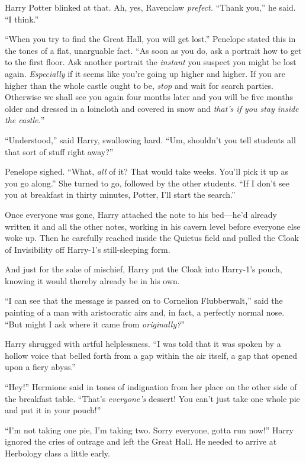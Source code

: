 Harry Potter blinked at that. Ah, yes, Ravenclaw \emph{prefect.} “Thank you,” he said. “I think.”

“When you try to find the Great Hall, you will get lost.” Penelope stated this in the tones of a flat, unarguable fact. “As soon as you do, ask a portrait how to get to the first floor. Ask another portrait the \emph{instant} you suspect you might be lost again. \emph{Especially} if it seems like you’re going up higher and higher. If you are higher than the whole castle ought to be, \emph{stop} and wait for search parties. Otherwise we shall see you again four months later and you will be five months older and dressed in a loincloth and covered in snow and \emph{that’s if you stay inside the castle.}”

“Understood,” said Harry, swallowing hard. “Um, shouldn’t you tell students all that sort of stuff right away?”

Penelope sighed. “What, \emph{all} of it? That would take weeks. You’ll pick it up as you go along.” She turned to go, followed by the other students. “If I don’t see you at breakfast in thirty minutes, Potter, I’ll start the search.”

Once everyone was gone, Harry attached the note to his bed—he’d already written it and all the other notes, working in his cavern level before everyone else woke up. Then he carefully reached inside the Quietus field and pulled the Cloak of Invisibility off Harry-1’s still-sleeping form.

And just for the sake of mischief, Harry put the Cloak into Harry-1’s pouch, knowing it would thereby already be in his own.

\later

“I can see that the message is passed on to Cornelion Flubberwalt,” said the painting of a man with aristocratic airs and, in fact, a perfectly normal nose. “But might I ask where it came from \emph{originally?}”

Harry shrugged with artful helplessness. “I was told that it was spoken by a hollow voice that belled forth from a gap within the air itself, a gap that opened upon a fiery abyss.”

\later

“Hey!” Hermione said in tones of indignation from her place on the other side of the breakfast table. “That’s \emph{everyone’s} dessert! You can’t just take one whole pie and put it in your pouch!”

“I’m not taking one pie, I’m taking two. Sorry everyone, gotta run now!” Harry ignored the cries of outrage and left the Great Hall. He needed to arrive at Herbology class a little early.

